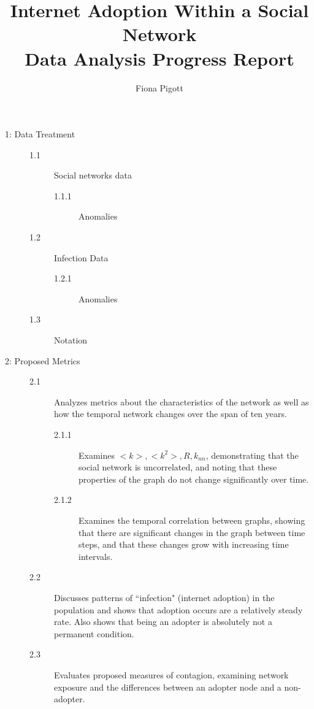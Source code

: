 \documentclass[12pt]{article}
\title{Internet Adoption Within a Social Network \\ Data Analysis Progress Report}
\author{Fiona Pigott}
\begin{document}
\maketitle

\begin{description}
	\item[1: Data Treatment]  \hfill
	\begin{description}
		\item[1.1] Social networks data
			\begin{description}
			\item[1.1.1] Anomalies
			\end{description}
		\item[1.2] Infection Data
			\begin{description}
			\item[1.2.1] Anomalies
			\end{description}
		\item[1.3] Notation
	\end{description}
	\item[2: Proposed Metrics] \hfill 
	\begin{description}
		\item[2.1] Analyzes metrics about the characteristics of the network as well as how the temporal network changes over the span of ten years.
		\begin{description}
			\item[2.1.1] Examines \(<k>,<k^2>,R,k_{nn}\), demonstrating that the social network is uncorrelated, and noting that these properties of the graph do not change significantly over time.
			\item[2.1.2] Examines the temporal correlation between graphs, showing that there are significant changes in the graph between time steps, and that these changes grow with increasing time intervals. %
		\end{description}
		\item[2.2] Discusses patterns of ``infection" (internet adoption) in the population and shows that adoption occurs are a relatively steady rate. Also shows that being an adopter is absolutely not a permanent condition.
		\item[2.3] Evaluates proposed measures of contagion, examining network exposure and the differences between an adopter node and a non-adopter.
	\end{description}
\end{description}
\end{document}
